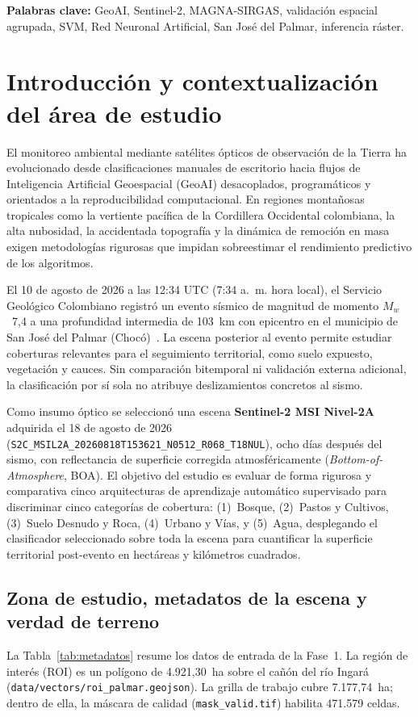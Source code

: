 \documentclass[11pt,a4paper]{article}
\begin{document}
\vspace{0.3cm}
\noindent\textbf{Palabras clave:} GeoAI, Sentinel-2, MAGNA-SIRGAS, validación espacial agrupada, SVM, Red Neuronal Artificial, San José del Palmar, inferencia ráster.

\section{Introducción y contextualización del área de estudio}

El monitoreo ambiental mediante satélites ópticos de observación de la Tierra ha evolucionado desde clasificaciones manuales de escritorio hacia flujos de Inteligencia Artificial Geoespacial (GeoAI) desacoplados, programáticos y orientados a la reproducibilidad computacional. En regiones montañosas tropicales como la vertiente pacífica de la Cordillera Occidental colombiana, la alta nubosidad, la accidentada topografía y la dinámica de remoción en masa exigen metodologías rigurosas que impidan sobreestimar el rendimiento predictivo de los algoritmos.

El 10 de agosto de 2026 a las 12:34 UTC (7:34 a.~m. hora local), el Servicio Geológico Colombiano registró un evento sísmico de magnitud de momento $M_w$~7,4 a una profundidad intermedia de 103~km con epicentro en el municipio de San José del Palmar (Chocó)~\cite{sgc2026}. La escena posterior al evento permite estudiar coberturas relevantes para el seguimiento territorial, como suelo expuesto, vegetación y cauces. Sin comparación bitemporal ni validación externa adicional, la clasificación por sí sola no atribuye deslizamientos concretos al sismo.

Como insumo óptico se seleccionó una escena \textbf{Sentinel-2 MSI Nivel-2A} adquirida el 18 de agosto de 2026 (\texttt{S2C\_MSIL2A\_20260818T153621\_N0512\_R068\_T18NUL}), ocho días después del sismo, con reflectancia de superficie corregida atmosféricamente (\textit{Bottom-of-Atmosphere}, BOA). El objetivo del estudio es evaluar de forma rigurosa y comparativa cinco arquitecturas de aprendizaje automático supervisado para discriminar cinco categorías de cobertura: (1)~Bosque, (2)~Pastos y Cultivos, (3)~Suelo Desnudo y Roca, (4)~Urbano y Vías, y (5)~Agua, desplegando el clasificador seleccionado sobre toda la escena para cuantificar la superficie territorial post-evento en hectáreas y kilómetros cuadrados.

\subsection{Zona de estudio, metadatos de la escena y verdad de terreno}
La Tabla~\ref{tab:metadatos} resume los datos de entrada de la Fase~1. La región de interés (ROI) es un polígono de 4.921,30~ha sobre el cañón del río Ingará (\texttt{data/vectors/roi\_palmar.geojson}). La grilla de trabajo cubre 7.177,74~ha; dentro de ella, la máscara de calidad (\texttt{mask\_valid.tif}) habilita 471.579 celdas.
\end{document}
